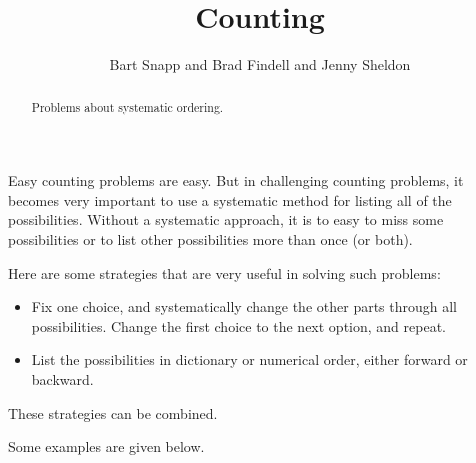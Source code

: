 \documentclass[nooutcomes]{ximera}
\title{Counting}
\author{Bart Snapp and Brad Findell and Jenny Sheldon}
\begin{document}
\begin{abstract}
Problems about systematic ordering.
\end{abstract}
\maketitle


Easy counting problems are easy.  But in challenging counting problems, it becomes very important to use a systematic method for listing all of the possibilities.  Without a systematic approach, it is to easy to miss some possibilities or to    
list other possibilities more than once (or both). 

Here are some strategies that are very useful in solving such problems:  
\begin{itemize}
\item Fix one choice, and systematically change the other parts through all possibilities.  Change the first choice to the next option, and repeat.  
\item List the possibilities in dictionary or numerical order, either forward or backward. 
\end{itemize}
These strategies can be combined.  

Some examples are given below. 
\end{document}
